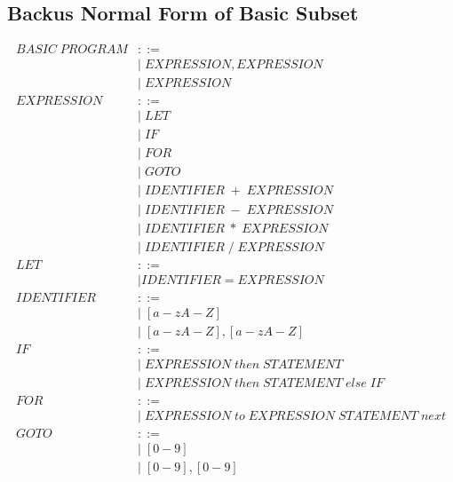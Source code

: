 \documentclass{report}
\begin{document}
\subsection*{Backus Normal Form of Basic Subset}
\begin{align*}
BASIC \; PROGRAM &::=				\\ 
	&|\; EXPRESSION, EXPRESSION 		\\
	&|\; EXPRESSION				\\
	EXPRESSION &::=				\\
	&|\; LET				\\
	&|\; IF					\\
	&|\; FOR 				\\
	&|\; GOTO				\\
	&|\; IDENTIFIER\;+\;EXPRESSION		\\
	&|\; IDENTIFIER\;-\;EXPRESSION		\\
	&|\; IDENTIFIER\;*\;EXPRESSION		\\
	&|\; IDENTIFIER\;/\;EXPRESSION		\\
	LET &::=				\\
	&| IDENTIFIER = EXPRESSION		\\
	IDENTIFIER &::=				\\
	&|\; [a-zA-Z] 				\\
	&|\; [a-zA-Z],[a-zA-Z]			\\
	IF &::=					\\
	&|\; EXPRESSION\;then\;STATEMENT	\\
	&|\; EXPRESSION\;then\;STATEMENT\;else\;IF\\
	FOR &::=				\\
	&|\;EXPRESSION\;to\;EXPRESSION\;STATEMENT\;next\\
	GOTO &::=				\\
	&|\; [0-9] 				\\
	&|\; [0-9],[0-9] 			\\
\end{align*}
\end{document}
